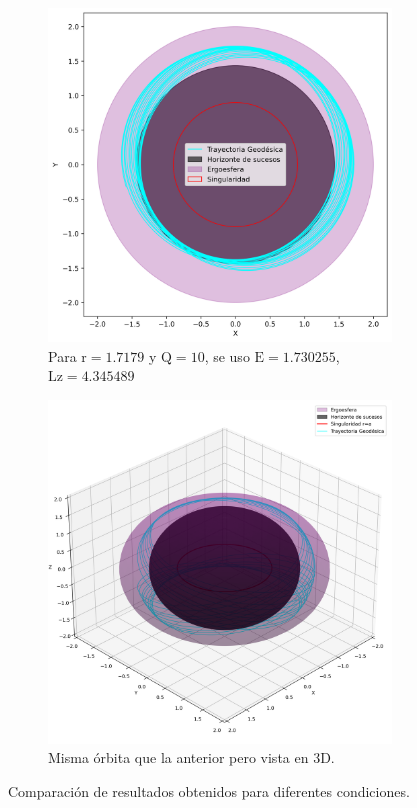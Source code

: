 \begin{figure}[H]
    \begin{subfigure}{0.4\textwidth}
        \includegraphics[width=\linewidth]{AgujerosNegros/kerr/geodesics_plots/geodesica_circular_r1,71_Q10_planoxy.png}
        \caption{Para $\mathrm{r}=1.7179$ y $\mathrm{Q}=10$, se uso $\mathrm{E}=1.730255$, $\mathrm{Lz}=4.345489$}
    \end{subfigure}
    \begin{subfigure}{0.5\textwidth}
        \includegraphics[width=\linewidth]{AgujerosNegros/kerr/geodesics_plots/geodesica_circular_r1,71_Q10.png}
        \caption{Misma órbita que la anterior pero vista en 3D.}
    \end{subfigure}
    \caption{Comparación de resultados obtenidos para diferentes condiciones.}
\end{figure}


